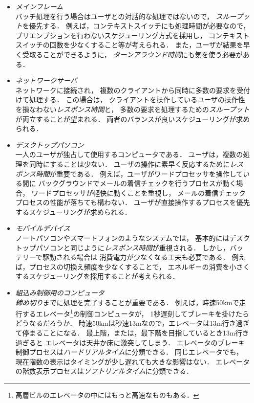 \begin{itemize}
\item \emph{メインフレーム} \\
  バッチ処理を行う場合はユーザとの対話的な処理ではないので，
  \emph{スループット}を優先する．
  例えば，コンテキストスイッチにも処理時間が必要なので，
  プリエンプションを行わないスケジューリング方式を採用し，
  コンテキストスイッチの回数を少なくすること等が考えられる．
  また，ユーザが結果を早く受取ることができるように，
  \emph{ターンアラウンド時間}にも気を使う必要がある．
\item \emph{ネットワークサーバ} \\
  ネットワークに接続され，
  複数のクライアントから同時に多数の要求を受付けて処理する．
  この場合は，
  クライアントを操作しているユーザの操作性を損なわない\emph{レスポンス時間}と，
  多数の要求を処理するための\emph{スループット}が両立することが望まれる．
  両者のバランスが良いスケジューリングが求められる．
\item \emph{デスクトップパソコン} \\
  一人のユーザが独占して使用するコンピュータである．
  ユーザは，複数の処理を同時にすることは少ない．
  ユーザの操作に素早く反応するために\emph{レスポンス時間}が重要である．
  例えば，ユーザがワードプロセッサを操作している間に
  バックグラウンドでメールの着信チェックを行うプロセスが動く場合，
  ワードプロセッサが軽快に動くことを重視し，
  メールの着信チェックプロセスの性能が落ちても構わない．
  ユーザが直接操作するプロセスを優先するスケジューリングが求められる．
\item \emph{モバイルデバイス} \\
  ノートパソコンやスマートフォンのようなシステムでは，
  基本的にはデスクトップパソコンと同じように\emph{レスポンス時間}が重視される．
  しかし，バッテリーで駆動される場合は
  消費電力が少なくなる工夫も必要である．
  例えば，プロセスの切換え頻度を少なくすることで，
  エネルギーの消費を小さくするスケジューリングを採用することが考えられる．
\item \emph{組込み制御用のコンピュータ} \\
  \emph{締め切り}までに処理を完了することが重要である．
  例えば，時速50kmで走行するエレベータ\footnote{
    高層ビルのエレベータの中にはもっと高速なものもある．
  }の制御コンピュータが，
  1秒遅刻してブレーキを掛けたらどうなるだろうか．
  時速50kmは秒速13mなので，エレベータは13m行き過ぎて停まることになる．
  最上階，または，最下階を目指しているとき13m行き過ぎると
  エレベータは天井か床に激突してしまう．
  エレベータのブレーキ制御プロセスは\emph{ハードリアルタイム}に分類できる．
  同じエレベータでも，
  現在階数の表示はタイミングが少し遅れても大きな影響はない．
  エレベータの階数表示プロセスは\emph{ソフトリアルタイム}に分類できる．
\end{itemize}

